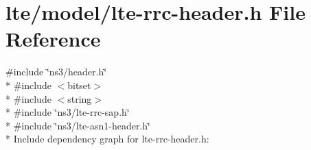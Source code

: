 \hypertarget{lte-rrc-header_8h}{}\section{lte/model/lte-\/rrc-\/header.h File Reference}
\label{lte-rrc-header_8h}
{\ttfamily \#include \char`\"{}ns3/header.\+h\char`\"{}}\\*
{\ttfamily \#include $<$bitset$>$}\\*
{\ttfamily \#include $<$string$>$}\\*
{\ttfamily \#include \char`\"{}ns3/lte-\/rrc-\/sap.\+h\char`\"{}}\\*
{\ttfamily \#include \char`\"{}ns3/lte-\/asn1-\/header.\+h\char`\"{}}\\*
Include dependency graph for lte-\/rrc-\/header.h\+:
